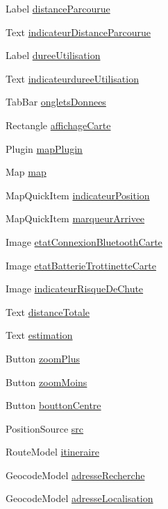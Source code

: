 \begin{DoxyCompactItemize}
Label \hyperlink{class_page_carte_a034ebe3a106110dc22f5ee8bae18f87b}{distance\+Parcourue}
\item 
Text \hyperlink{class_page_carte_a9741edd97f3bbffe384094090736900c}{indicateur\+Distance\+Parcourue}
\item 
Label \hyperlink{class_page_carte_a277e3b7d3dcba3a675e853122a45109e}{duree\+Utilisation}
\item 
Text \hyperlink{class_page_carte_aec12ab9dfdb0165276f6f41fcaa0525b}{indicateurduree\+Utilisation}
\item 
Tab\+Bar \hyperlink{class_page_carte_acca3b766f8874214b8300344c094dbbe}{onglets\+Donnees}
\item 
Rectangle \hyperlink{class_page_carte_a71510c3afaf8914bd7800d7f41cf4572}{affichage\+Carte}
\item 
Plugin \hyperlink{class_page_carte_a4e63a00c2287b930a49c821781997814}{map\+Plugin}
\item 
Map \hyperlink{class_page_carte_aacb6261b77a9d463379aa17305938cce}{map}
\item 
Map\+Quick\+Item \hyperlink{class_page_carte_a40b7fe9e6f8250856b923b042c97a5a5}{indicateur\+Position}
\item 
Map\+Quick\+Item \hyperlink{class_page_carte_ac957f423cdb504fe0e023cbc94322dd5}{marqueur\+Arrivee}
\item 
Image \hyperlink{class_page_carte_ae599f81f24a82946f75f68e85cafccbc}{etat\+Connexion\+Bluetooth\+Carte}
\item 
Image \hyperlink{class_page_carte_a5a73e49abed67e634aca9eaff4dff7f7}{etat\+Batterie\+Trottinette\+Carte}
\item 
Image \hyperlink{class_page_carte_ace08a458300ff3f9de709d257d35d175}{indicateur\+Risque\+De\+Chute}
\item 
Text \hyperlink{class_page_carte_aea49b9971ff80ccdc4eb9aba4b0fcc55}{distance\+Totale}
\item 
Text \hyperlink{class_page_carte_aaaaa7273751a2db869c16c7cd02e2b9a}{estimation}
\item 
Button \hyperlink{class_page_carte_a9d6fd98e7c648783f9865b2839665b10}{zoom\+Plus}
\item 
Button \hyperlink{class_page_carte_a4644424e3d5e139af73dec85c500d74d}{zoom\+Moins}
\item 
Button \hyperlink{class_page_carte_afb27dfd099ed625fa8d4fab997ff421e}{boutton\+Centre}
\item 
Position\+Source \hyperlink{class_page_carte_a601b30458f6e0a27f670522a69aebc89}{src}
\item 
Route\+Model \hyperlink{class_page_carte_a4bef895ff3ef4f2c89ba1f202d8500a9}{itineraire}
\item 
Geocode\+Model \hyperlink{class_page_carte_a67834fc06727ceb87a4ac2dc40025a44}{adresse\+Recherche}
\item 
Geocode\+Model \hyperlink{class_page_carte_a66dc1e3837176828499ec7f388278b61}{adresse\+Localisation}
\end{DoxyCompactItemize}


